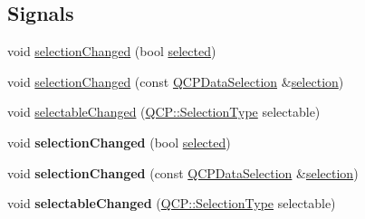 \subsection*{Signals}
\begin{DoxyCompactItemize}
\item 
void \hyperlink{class_q_c_p_abstract_plottable_a3af66432b1dca93b28e00e78a8c7c1d9}{selection\+Changed} (bool \hyperlink{class_q_c_p_abstract_plottable_a0b3b514474fe93354fc74cfc144184b4}{selected})
\item 
void \hyperlink{class_q_c_p_abstract_plottable_a787a9c39421059006891744b731fa473}{selection\+Changed} (const \hyperlink{class_q_c_p_data_selection}{Q\+C\+P\+Data\+Selection} \&\hyperlink{class_q_c_p_abstract_plottable_a040bf09f41d456284cfd39cc37aa068f}{selection})
\item 
void \hyperlink{class_q_c_p_abstract_plottable_a663b1a44123c8340ac041a29d1e2c973}{selectable\+Changed} (\hyperlink{namespace_q_c_p_ac6cb9db26a564b27feda362a438db038}{Q\+C\+P\+::\+Selection\+Type} selectable)
\item 
\mbox{\label{class_q_c_p_abstract_plottable_a3af66432b1dca93b28e00e78a8c7c1d9}} 
void {\bfseries selection\+Changed} (bool \hyperlink{class_q_c_p_abstract_plottable_a0b3b514474fe93354fc74cfc144184b4}{selected})
\item 
\mbox{\label{class_q_c_p_abstract_plottable_a787a9c39421059006891744b731fa473}} 
void {\bfseries selection\+Changed} (const \hyperlink{class_q_c_p_data_selection}{Q\+C\+P\+Data\+Selection} \&\hyperlink{class_q_c_p_abstract_plottable_a040bf09f41d456284cfd39cc37aa068f}{selection})
\item 
\mbox{\label{class_q_c_p_abstract_plottable_a663b1a44123c8340ac041a29d1e2c973}} 
void {\bfseries selectable\+Changed} (\hyperlink{namespace_q_c_p_ac6cb9db26a564b27feda362a438db038}{Q\+C\+P\+::\+Selection\+Type} selectable)
\end{DoxyCompactItemize}
